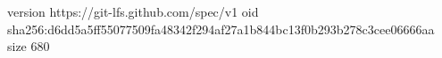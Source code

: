 version https://git-lfs.github.com/spec/v1
oid sha256:d6dd5a5ff55077509fa48342f294af27a1b844bc13f0b293b278c3cee06666aa
size 680
